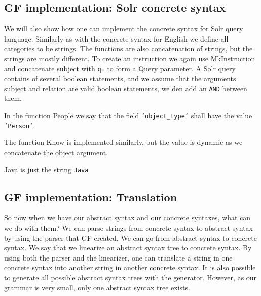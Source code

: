 \documentclass[
10pt, %
a4paper, %
oneside, %
headinclude,footinclude, %
BCOR5mm, %
]{scrartcl}
\begin{document}
\subsection{GF implementation: Solr concrete syntax}
We will also show how one can implement the concrete syntax for Solr query language. Similarly as with the concrete syntax for English we define all categories to be strings.
\newline
\newline
The functions are also concatenation of strings, but the strings are mostly different. To create an instruction we again use MkInstruction and concatenate subject with \texttt{q=} to form a Query parameter. A Solr query contains of several boolean statements, and we assume that the arguments subject and relation are valid boolean statements, we den add an \texttt{AND} between them.

In the function People we say that the field \texttt{'object\_type'} shall have the value \texttt{'Person'}. 

The function Know is implemented similarly, but the value is dynamic as we concatenate the object argument.

Java is just the string \texttt{Java}

\subsection{GF implementation: Translation}
So now when we have our abstract syntax and our concrete syntaxes, what can we do with them?
\newline
\newline
We can parse strings from concrete syntax to abstract syntax by using the parser that GF created.
\newline
\newline
We can go from abstract syntax to concrete syntax. We say that we linearize an abstract syntax tree to concrete syntax. By using both the parser and the linearizer, one can translate a string in one concrete syntax into another string in another concrete syntax.
\newline
\newline
It is also possible to generate all possible abstract syntax trees with the generator. However, as our grammar is very small, only one abstract syntax tree exists.
\end{document}
